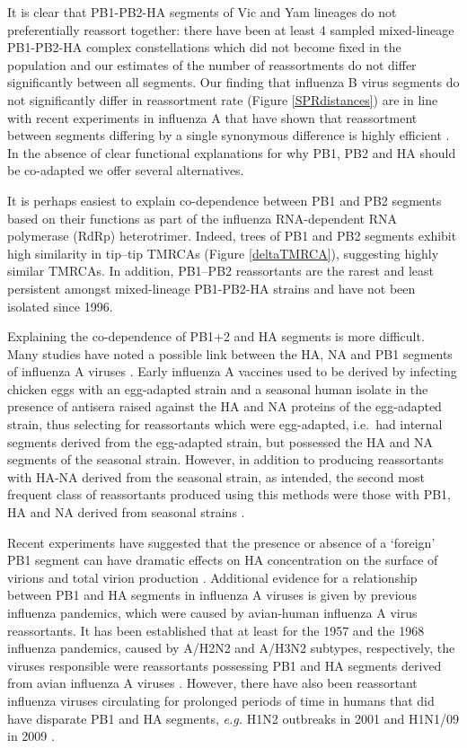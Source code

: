 \documentclass[11pt,oneside,letterpaper]{article}
\begin{document}
It is clear that PB1-PB2-HA segments of Vic and Yam lineages do not preferentially reassort together: there have been at least 4 sampled mixed-lineage PB1-PB2-HA complex constellations which did not become fixed in the population and our estimates of the number of reassortments do not differ significantly between all segments.
Our finding that influenza B virus segments do not significantly differ in reassortment rate (Figure \ref{SPRdistances}) are in line with recent experiments in influenza A that have shown that reassortment between segments differing by a single synonymous difference is highly efficient \cite{marshall2013}.
In the absence of clear functional explanations for why PB1, PB2 and HA should be co-adapted we offer several alternatives.

It is perhaps easiest to explain co-dependence between PB1 and PB2 segments based on their functions as part of the influenza RNA-dependent RNA polymerase (RdRp) heterotrimer.
Indeed, trees of PB1 and PB2 segments exhibit high similarity in tip--tip TMRCAs (Figure \ref{deltaTMRCA}), suggesting highly similar TMRCAs.
In addition, PB1--PB2 reassortants are the rarest and least persistent amongst mixed-lineage PB1-PB2-HA strains and have not been isolated since 1996.

Explaining the co-dependence of PB1+2 and HA segments is more difficult.
Many studies have noted a possible link between the HA, NA and PB1 segments of influenza A viruses \cite{bergeron2010,fulvini2011}.
Early influenza A vaccines used to be derived by infecting chicken eggs with an egg-adapted strain and a seasonal human isolate in the presence of antisera raised against the HA and NA proteins of the egg-adapted strain, thus selecting for reassortants which were egg-adapted, i.e.\ had internal segments derived from the egg-adapted strain, but possessed the HA and NA segments of the seasonal strain.
However, in addition to producing reassortants with HA-NA derived from the seasonal strain, as intended, the second most frequent class of reassortants produced using this methods were those with PB1, HA and NA derived from seasonal strains \cite{bergeron2010,fulvini2011}.

Recent experiments have suggested that the presence or absence of a `foreign' PB1 segment can have dramatic effects on HA concentration on the surface of virions and total virion production \cite{cobbin2013}.
Additional evidence for a relationship between PB1 and HA segments in influenza A viruses is given by previous influenza pandemics, which were caused by avian-human influenza A virus reassortants.
It has been established that at least for the 1957 and the 1968 influenza pandemics, caused by A/H2N2 and A/H3N2 subtypes, respectively, the viruses responsible were reassortants possessing PB1 and HA segments derived from avian influenza A viruses \cite{kawaoka1989}.
However, there have also been reassortant influenza viruses circulating for prolonged periods of time in humans that did have disparate PB1 and HA segments, \textit{e.g.} H1N2 outbreaks in 2001 \cite{gregory2002} and H1N1/09 in 2009 \cite{smith2009}.
\end{document}
